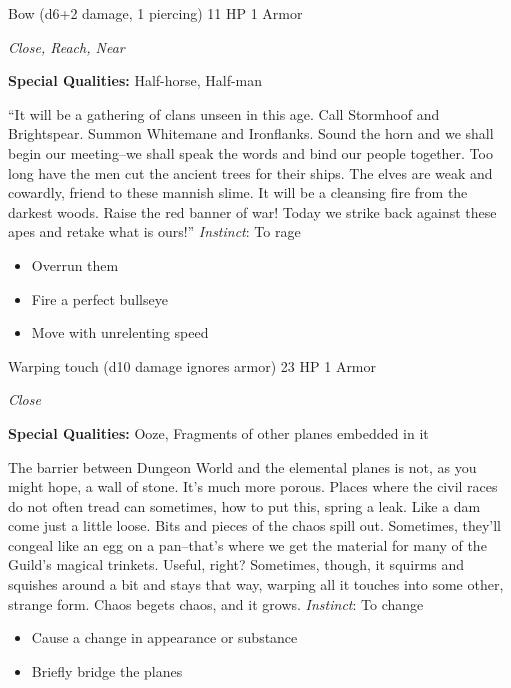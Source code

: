 Bow (d6+2 damage, 1 piercing)\hspace*{\fill} 11 HP 1 Armor

\emph{Close, Reach, Near}

\textbf{Special Qualities:}
Half-horse, Half-man

\HRule
``It will be a gathering of clans unseen in this age. Call Stormhoof and Brightspear. Summon Whitemane and Ironflanks. Sound the horn and we shall begin our meeting--we shall speak the words and bind our people together. Too long have the men cut the ancient trees for their ships. The elves are weak and cowardly, friend to these mannish slime. It will be a cleansing fire from the darkest woods. Raise the red banner of war! Today we strike back against these apes and retake what is ours!'' \emph{Instinct}: To rage
\begin{itemize}
\item Overrun them
\item Fire a perfect bullseye
\item Move with unrelenting speed
\end{itemize}

\HRule
{}

Warping touch (d10 damage ignores armor)\hspace*{\fill} 23 HP 1 Armor

\emph{Close}

\textbf{Special Qualities:}
Ooze, Fragments of other planes embedded in it

\HRule
The barrier between Dungeon World and the elemental planes is not, as you might hope, a wall of stone. It's much more porous. Places where the civil races do not often tread can sometimes, how to put this, spring a leak. Like a dam come just a little loose. Bits and pieces of the chaos spill out. Sometimes, they'll congeal like an egg on a pan--that's where we get the material for many of the Guild's magical trinkets. Useful, right? Sometimes, though, it squirms and squishes around a bit and stays that way, warping all it touches into some other, strange form. Chaos begets chaos, and it grows. \emph{Instinct}: To change
\begin{itemize}
\item Cause a change in appearance or substance
\item Briefly bridge the planes
\end{itemize}

\HRule
{}

